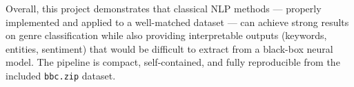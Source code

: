 Overall, this project demonstrates that classical NLP methods — properly implemented and applied to a well-matched dataset — can achieve strong results on genre classification while also providing interpretable outputs (keywords, entities, sentiment) that would be difficult to extract from a black-box neural model. The pipeline is compact, self-contained, and fully reproducible from the included \texttt{bbc.zip} dataset.
